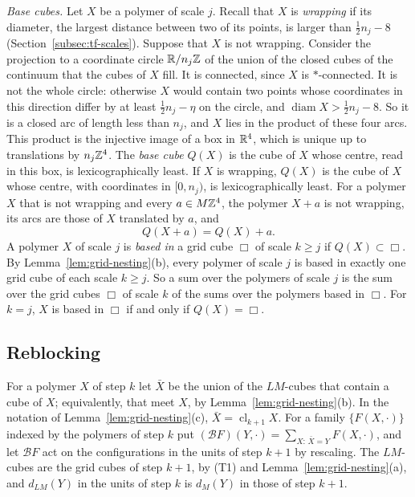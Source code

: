 \emph{Base cubes.} Let $X$ be a polymer of scale $j$. Recall that $X$ is \emph{wrapping} if its diameter, the largest distance between two of its points, is larger than $\frac12n_j-8$ (Section~\ref{subsec:tf-scales}). Suppose that $X$ is not wrapping. Consider the projection to a coordinate circle $\mathbb R/n_j\mathbb Z$ of the union of the closed cubes of the continuum that the cubes of $X$ fill. It is connected, since $X$ is $*$-connected. It is not the whole circle: otherwise $X$ would contain two points whose coordinates in this direction differ by at least $\frac12n_j-\eta$ on the circle, and $\operatorname{diam}X>\frac12n_j-8$. So it is a closed arc of length less than $n_j$, and $X$ lies in the product of these four arcs. This product is the injective image of a box in $\mathbb R^4$, which is unique up to translations by $n_j\mathbb Z^4$. The \emph{base cube} $Q(X)$ is the cube of $X$ whose centre, read in this box, is lexicographically least. If $X$ is wrapping, $Q(X)$ is the cube of $X$ whose centre, with coordinates in $[0,n_j)$, is lexicographically least. For a polymer $X$ that is not wrapping and every $a\in M\mathbb Z^4$, the polymer $X+a$ is not wrapping, its arcs are those of $X$ translated by $a$, and
\[
Q(X+a)=Q(X)+a .
\]
A polymer $X$ of scale $j$ is \emph{based in} a grid cube $\Box$ of scale $k\ge j$ if $Q(X)\subset\Box$. By Lemma~\ref{lem:grid-nesting}(b), every polymer of scale $j$ is based in exactly one grid cube of each scale $k\ge j$. So a sum over the polymers of scale $j$ is the sum over the grid cubes $\Box$ of scale $k$ of the sums over the polymers based in $\Box$. For $k=j$, $X$ is based in $\Box$ if and only if $Q(X)=\Box$.

\subsection{Reblocking}\label{subsec:flow-reblock}

For a polymer $X$ of step $k$ let $\bar X$ be the union of the $LM$-cubes that contain a cube of $X$; equivalently, that meet $X$, by Lemma~\ref{lem:grid-nesting}(b). In the notation of Lemma~\ref{lem:grid-nesting}(c), $\bar X=\operatorname{cl}_{k+1}X$. For a family $\{F(X,\cdot)\}$ indexed by the polymers of step $k$ put $(\mathcal BF)(Y,\cdot)=\sum_{X:\,\bar X=Y}F(X,\cdot)$, and let $\mathcal BF$ act on the configurations in the units of step $k+1$ by rescaling. The $LM$-cubes are the grid cubes of step $k+1$, by (T1) and Lemma~\ref{lem:grid-nesting}(a), and $d_{LM}(Y)$ in the units of step $k$ is $d_M(Y)$ in those of step $k+1$.

